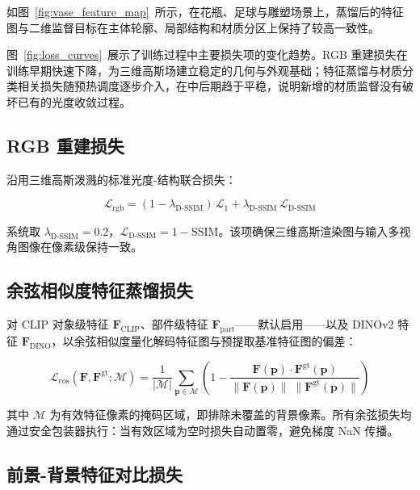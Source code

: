 如图~\ref{fig:vase_feature_map}~所示，在花瓶、足球与雕塑场景上，蒸馏后的特征图与二维监督目标在主体轮廓、局部结构和材质分区上保持了较高一致性。

图~\ref{fig:loss_curves}~展示了训练过程中主要损失项的变化趋势。RGB 重建损失在训练早期快速下降，为三维高斯场建立稳定的几何与外观基础；特征蒸馏与材质分类相关损失随预热调度逐步介入，在中后期趋于平稳，说明新增的材质监督没有破坏已有的光度收敛过程。

\subsection{RGB 重建损失}

沿用三维高斯泼溅的标准光度-结构联合损失：

\begin{equation}
\mathcal{L}_{\text{rgb}} = (1 - \lambda_{\text{D-SSIM}}) \,\mathcal{L}_1 + \lambda_{\text{D-SSIM}} \,\mathcal{L}_{\text{D-SSIM}}
\label{eq:rgb_loss}
\end{equation}

系统取 $\lambda_{\text{D-SSIM}} = 0.2$，$\mathcal{L}_{\text{D-SSIM}} = 1 - \mathrm{SSIM}$。该项确保三维高斯渲染图与输入多视角图像在像素级保持一致。

\subsection{余弦相似度特征蒸馏损失}

对 CLIP 对象级特征 $\mathbf{F}_{\text{CLIP}}$、部件级特征 $\mathbf{F}_{\text{part}}$——默认启用——以及 DINOv2 特征 $\mathbf{F}_{\text{DINO}}$，以余弦相似度量化解码特征图与预提取基准特征图的偏差：

\begin{equation}
\mathcal{L}_{\text{cos}}(\mathbf{F}, \mathbf{F}^{\text{gt}}; \mathcal{M}) = \frac{1}{|\mathcal{M}|} \sum_{\mathbf{p} \in \mathcal{M}} \left( 1 - \frac{\mathbf{F}(\mathbf{p}) \cdot \mathbf{F}^{\text{gt}}(\mathbf{p})}{\|\mathbf{F}(\mathbf{p})\| \;\|\mathbf{F}^{\text{gt}}(\mathbf{p})\|} \right)
\label{eq:cos_loss}
\end{equation}

其中 $\mathcal{M}$ 为有效特征像素的掩码区域，即排除未覆盖的背景像素。所有余弦损失均通过安全包装器执行：当有效区域为空时损失自动置零，避免梯度 NaN 传播。

\subsection{前景-背景特征对比损失}

